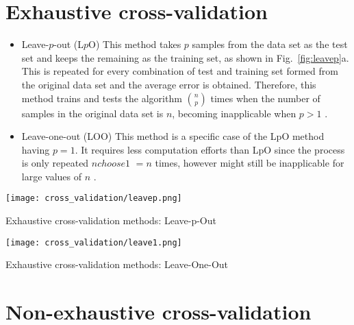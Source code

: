 \section{Exhaustive cross-validation}
\begin{itemize}
\item Leave-$p$-out (L$p$O) \newline {}
This method takes $p$ samples from the data set as the test set and keeps the remaining as the training set, as shown in Fig.~\ref{fig:leavep}a. This is repeated for every combination of test and training set formed from the original data set and the average error is obtained. Therefore, this method trains and tests the algorithm $n\choose p$ times when the number of samples in the original data set is $n$, becoming inapplicable when $p>1$ \citep{arlot2010survey}.

\item Leave-one-out (LOO)\newline {}
This method is a specific case of the LpO method having $p=1$. It requires less computation efforts than LpO since the process is only repeated $n choose 1$ $= n$ times, however might still be inapplicable for large values of $n$ \citep{arlot2010survey}. 
\end{itemize}

\begin{marginfigure}%
	\centering
    \texttt{[image: cross\_validation/leavep.png]}
	\caption{Exhaustive cross-validation methods: Leave-p-Out}
\end{marginfigure}
\begin{marginfigure}%
	\texttt{[image: cross\_validation/leave1.png]}
	\caption{Exhaustive cross-validation methods: Leave-One-Out}
	\label{fig:leavep}
\end{marginfigure}

\section{Non-exhaustive cross-validation}


